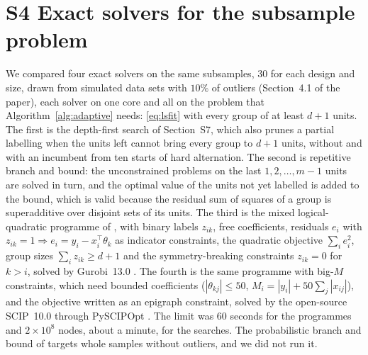 \section*{S4 Exact solvers for the subsample problem}
\label{supp:solvers}

We compared four exact solvers on the same subsamples, $30$ for each design and size, drawn from
simulated data sets with $10\%$ of outliers (Section~4.1 of the paper), each solver on one core
and all on the problem that Algorithm~\ref{alg:adaptive} needs: \eqref{eq:lsfit} with every
group of at least $d+1$ units. The first is the depth-first search of Section~S7, which also prunes a
partial labelling when the units left cannot bring every group to $d+1$ units, without and with
an incumbent from ten starts of hard alternation. The second is repetitive branch and bound: the
unconstrained problems on the last $1,2,\dots,m-1$ units are solved in turn, and the optimal value
of the units not yet labelled is added to the bound, which is valid because the residual sum of
squares of a group is superadditive over disjoint sets of its units. The third is the mixed
logical-quadratic programme of \citet{carbonneau2011globally}, with binary labels $z_{ik}$, free
coefficients, residuals $e_i$ with $z_{ik}=1\Rightarrow e_i=y_i-x_i^{\top}\theta_k$ as indicator
constraints, the quadratic objective $\sum_ie_i^{2}$, group sizes $\sum_iz_{ik}\ge d+1$ and the
symmetry-breaking constraints $z_{ik}=0$ for $k>i$, solved by Gurobi~13.0 \citep{gurobi2026}.
The fourth is the same programme with big-$M$ constraints, which need bounded coefficients
($|\theta_{kj}|\le50$, $M_i=|y_i|+50\sum_j|x_{ij}|$), and the objective written as an epigraph
constraint, solved by the open-source SCIP~10.0 through PySCIPOpt \citep{maher2016pyscipopt}.
The limit was $60$ seconds for the programmes and $2\times10^{8}$ nodes, about a minute, for the
searches. The probabilistic branch and bound of \citet{fois2026clusterwise} targets whole samples
without outliers, and we did not run it.

\begin{table}[htbp]
\centering
\small
\caption{Exact solution of the admissible subsample problem: median time in milliseconds over
$30$ subsamples, and the median number of nodes of our search. A superscript counts the solves
that reached the limit.}
\label{tab:solvers}

\end{table}

